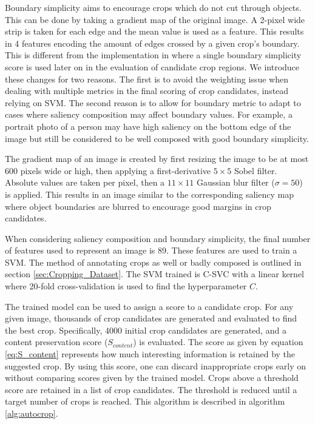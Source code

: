 Boundary simplicity aims to encourage crops which do not cut through objects.
This can be done by taking a gradient map of the original image.
A 2-pixel wide strip is taken for each edge and the mean value is used as a
feature.
This results in 4 features encoding the amount of edges crossed by a given
crop's boundary.
This is different from the implementation in \cite{fang2014automatic} where a single boundary simplicity score is used later on in the evaluation of candidate crop regions.
We introduce these changes for two reasons.
The first is to avoid the weighting issue when dealing with multiple metrics in the final scoring of crop candidates, instead relying on SVM.
The second reason is to allow for boundary metric to adapt to cases where saliency composition may affect boundary values.
For example, a portrait photo of a person may have high saliency on the bottom edge of the image but still be considered to be well composed with good boundary simplicity.

The gradient map of an image is created by first resizing the image to be at
most 600 pixels wide or high, then applying a first-derivative $5\times5$ Sobel
filter.
Absolute values are taken per pixel, then a $11\times11$ Gaussian blur filter
($\sigma=50$) is applied.
This results in an image similar to the corresponding saliency map where object
boundaries are blurred to encourage good margins in crop candidates.

When considering saliency composition and boundary simplicity, the final number
of features used to represent an image is 89.
These features are used to train a SVM.
The method of annotating crops as well or badly composed is outlined in section
\ref{sec:Cropping_Dataset}.
The SVM trained is C-SVC with a linear kernel where 20-fold cross-validation is
used to find the hyperparameter $C$.

The trained model can be used to assign a score to a candidate crop. For any
given image, thousands of crop candidates are generated and evaluated to find
the best crop.
Specifically, $4000$ initial crop candidates are generated, and a content
preservation score ($S_{content}$) is evaluated.
The score as given by equation \ref{eq:S_content} represents how much
interesting information is retained by the suggested crop.
By using this score, one can discard inappropriate crops early on without
comparing scores given by the trained model.
Crops above a threshold score are retained in a list of crop candidates.
The threshold is reduced until a target number of crops is reached.
This algorithm is described in algorithm \ref{alg:autocrop}.


